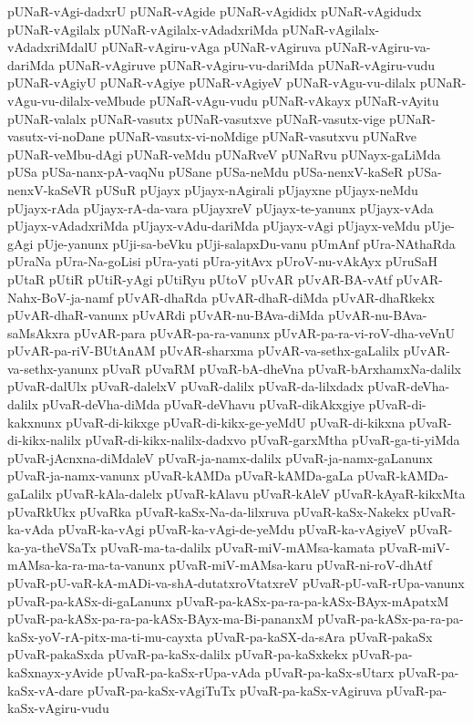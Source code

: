 {pUNaR-vAgi-dadxrU
pUNaR-vAgide
pUNaR-vAgididx
pUNaR-vAgidudx
pUNaR-vAgilalx
pUNaR-vAgilalx-vAdadxriMda
pUNaR-vAgilalx-vAdadxriMdalU
pUNaR-vAgiru-vAga
pUNaR-vAgiruva
pUNaR-vAgiru-va-dariMda
pUNaR-vAgiruve
pUNaR-vAgiru-vu-dariMda
pUNaR-vAgiru-vudu
pUNaR-vAgiyU
pUNaR-vAgiye
pUNaR-vAgiyeV
pUNaR-vAgu-vu-dilalx
pUNaR-vAgu-vu-dilalx-veMbude
pUNaR-vAgu-vudu
pUNaR-vAkayx
pUNaR-vAyitu
pUNaR-valalx
pUNaR-vasutx
pUNaR-vasutxve
pUNaR-vasutx-vige
pUNaR-vasutx-vi-noDane
pUNaR-vasutx-vi-noMdige
pUNaR-vasutxvu
pUNaRve
pUNaR-veMbu-dAgi
pUNaR-veMdu
pUNaRveV
pUNaRvu
pUNayx-gaLiMda
pUSa
pUSa-nanx-pA-vaqNu
pUSane
pUSa-neMdu
pUSa-nenxV-kaSeR
pUSa-nenxV-kaSeVR
pUSuR
pUjayx
pUjayx-nAgirali
pUjayxne
pUjayx-neMdu
pUjayx-rAda
pUjayx-rA-da-vara
pUjayxreV
pUjayx-te-yanunx
pUjayx-vAda
pUjayx-vAdadxriMda
pUjayx-vAdu-dariMda
pUjayx-vAgi
pUjayx-veMdu
pUje-gAgi
pUje-yanunx
pUji-sa-beVku
pUji-salapxDu-vanu
pUmAnf
pUra-NAthaRda
pUraNa
pUra-Na-goLisi
pUra-yati
pUra-yitAvx
pUroV-nu-vAkAyx
pUruSaH
pUtaR
pUtiR
pUtiR-yAgi
pUtiRyu
pUtoV
pUvAR
pUvAR-BA-vAtf
pUvAR-Nahx-BoV-ja-namf
pUvAR-dhaRda
pUvAR-dhaR-diMda
pUvAR-dhaRkekx
pUvAR-dhaR-vanunx
pUvARdi
pUvAR-nu-BAva-diMda
pUvAR-nu-BAva-saMsAkxra
pUvAR-para
pUvAR-pa-ra-vanunx
pUvAR-pa-ra-vi-roV-dha-veVnU
pUvAR-pa-riV-BUtAnAM
pUvAR-sharxma
pUvAR-va-sethx-gaLalilx
pUvAR-va-sethx-yanunx
pUvaR
pUvaRM
pUvaR-bA-dheVna
pUvaR-bArxhamxNa-dalilx
pUvaR-dalUlx
pUvaR-dalelxV
pUvaR-dalilx
pUvaR-da-lilxdadx
pUvaR-deVha-dalilx
pUvaR-deVha-diMda
pUvaR-deVhavu
pUvaR-dikAkxgiye
pUvaR-di-kakxnunx
pUvaR-di-kikxge
pUvaR-di-kikx-ge-yeMdU
pUvaR-di-kikxna
pUvaR-di-kikx-nalilx
pUvaR-di-kikx-nalilx-dadxvo
pUvaR-garxMtha
pUvaR-ga-ti-yiMda
pUvaR-jAcnxna-diMdaleV
pUvaR-ja-namx-dalilx
pUvaR-ja-namx-gaLanunx
pUvaR-ja-namx-vanunx
pUvaR-kAMDa
pUvaR-kAMDa-gaLa
pUvaR-kAMDa-gaLalilx
pUvaR-kAla-dalelx
pUvaR-kAlavu
pUvaR-kAleV
pUvaR-kAyaR-kikxMta
pUvaRkUkx
pUvaRka
pUvaR-kaSx-Na-da-lilxruva
pUvaR-kaSx-Nakekx
pUvaR-ka-vAda
pUvaR-ka-vAgi
pUvaR-ka-vAgi-de-yeMdu
pUvaR-ka-vAgiyeV
pUvaR-ka-ya-theVSaTx
pUvaR-ma-ta-dalilx
pUvaR-miV-mAMsa-kamata
pUvaR-miV-mAMsa-ka-ra-ma-ta-vanunx
pUvaR-miV-mAMsa-karu
pUvaR-ni-roV-dhAtf
pUvaR-pU-vaR-kA-mADi-va-shA-dutatxroVtatxreV
pUvaR-pU-vaR-rUpa-vanunx
pUvaR-pa-kASx-di-gaLanunx
pUvaR-pa-kASx-pa-ra-pa-kASx-BAyx-mApatxM
pUvaR-pa-kASx-pa-ra-pa-kASx-BAyx-ma-Bi-pananxM
pUvaR-pa-kASx-pa-ra-pa-kaSx-yoV-rA-pitx-ma-ti-mu-cayxta
pUvaR-pa-kaSX-da-sAra
pUvaR-pakaSx
pUvaR-pakaSxda
pUvaR-pa-kaSx-dalilx
pUvaR-pa-kaSxkekx
pUvaR-pa-kaSxnayx-yAvide
pUvaR-pa-kaSx-rUpa-vAda
pUvaR-pa-kaSx-sUtarx
pUvaR-pa-kaSx-vA-dare
pUvaR-pa-kaSx-vAgiTuTx
pUvaR-pa-kaSx-vAgiruva
pUvaR-pa-kaSx-vAgiru-vudu
}
